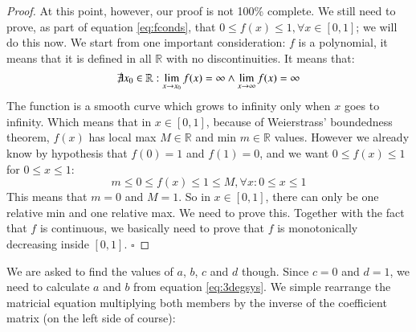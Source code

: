 \begin{proposition}
\begin{proof}
At this point, however, our proof is not 100\% complete. We still need to prove,
as part of equation \ref{eq:fconds}, that 
$0 \leq f(x) \leq 1, \forall x \in [0,1]$; we will do this now. We start from one
important consideration: $f$ is a polynomial, it means that it is defined in all
$\mathbb{R}$ with no discontinuities. It means that:
\begin{equation*}
\not\exists x_0 \in \mathbb{R} : \lim_{x \to x_0} f(x) = \infty \wedge
\lim_{x \to \infty} f(x) = \infty
\end{equation*}
The function is a smooth curve which grows to infinity only when $x$ goes to
infinity. Which means that in $x \in [0,1]$, because of Weierstrass'
boundedness theorem, $f(x)$ has local max $M \in \mathbb{R}$ 
and min $m \in \mathbb{R}$ values. However we already know by hypothesis that
$f(0) = 1$ and $f(1) = 0$, and we want $0 \leq f(x) \leq 1$ for $0 \leq x \leq 1$:
\begin{equation*}
m \leq 0 \leq f(x) \leq 1 \leq M, \forall x : 0 \leq x \leq 1
\end{equation*}
This means that $m=0$ and $M = 1$. So in $x\in[0,1]$, there can only be one
relative min and one relative max. We need to prove this. Together
with the fact that $f$ is continuous, we basically need to prove that $f$ is
monotonically decreasing inside $[0,1]$.
$\square$
\end{proof}
\end{proposition}
We are asked to find the values of $a$, $b$, $c$ and $d$ though. Since $c=0$ and
$d=1$, we need to calculate $a$ and $b$ from equation \ref{eq:3degsys}.
We simple rearrange the matricial equation multiplying both members by the
inverse of the coefficient matrix (on the left side of course):
